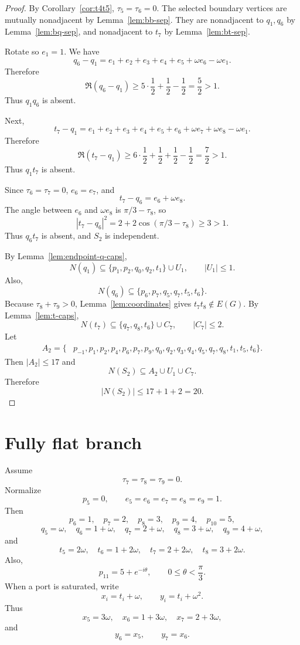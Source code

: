 \documentclass[11pt]{article}
\begin{document}
\begin{proof}
By Corollary~\ref{cor:t4t5}, $\tau_5=\tau_6=0$. The selected boundary vertices are mutually nonadjacent by Lemma~\ref{lem:bb-sep}. They are nonadjacent to $q_1,q_6$ by Lemma~\ref{lem:bq-sep}, and nonadjacent to $t_7$ by Lemma~\ref{lem:bt-sep}.

Rotate so $e_1=1$. We have
\[
  q_6-q_1=e_1+e_2+e_3+e_4+e_5+\omega e_6-\omega e_1.
\]
Therefore
\[
  \Re(q_6-q_1)\ge5\cdot\frac12+\frac12-\frac12=\frac52>1.
\]
Thus $q_1q_6$ is absent.

Next,
\[
  t_7-q_1=e_1+e_2+e_3+e_4+e_5+e_6+\omega e_7+\omega e_8-\omega e_1.
\]
Therefore
\[
  \Re(t_7-q_1)\ge6\cdot\frac12+\frac12+\frac12-\frac12=\frac72>1.
\]
Thus $q_1t_7$ is absent.

Since $\tau_6=\tau_7=0$, $e_6=e_7$, and
\[
  t_7-q_6=e_6+\omega e_8.
\]
The angle between $e_6$ and $\omega e_8$ is $\pi/3-\tau_8$, so
\[
  |t_7-q_6|^2=2+2\cos(\pi/3-\tau_8)\ge3>1.
\]
Thus $q_6t_7$ is absent, and $S_2$ is independent.

By Lemma~\ref{lem:endpoint-q-caps},
\[
  N(q_1)\subseteq\{p_1,p_2,q_0,q_2,t_1\}\cup U_1,
  \qquad |U_1|\le1.
\]
Also,
\[
  N(q_6)\subseteq\{p_6,p_7,q_5,q_7,t_5,t_6\}.
\]
Because $\tau_8+\tau_9>0$, Lemma~\ref{lem:coordinates} gives $t_7t_8\notin E(G)$. By Lemma~\ref{lem:t-caps},
\[
  N(t_7)\subseteq\{q_7,q_8,t_6\}\cup C_7,
  \qquad |C_7|\le2.
\]
Let
\[
\begin{aligned}
A_2=\{&p_{-1},p_1,p_2,p_4,p_6,p_7,p_9,q_0,q_2,q_3,q_4,q_5,q_7,q_8,t_1,t_5,t_6\}.
\end{aligned}
\]
Then $|A_2|\le17$ and
\[
  N(S_2)\subseteq A_2\cup U_1\cup C_7.
\]
Therefore
\[
  |N(S_2)|\le17+1+2=20.
\]
\end{proof}

\section{Fully flat branch}

Assume
\[
  \tau_7=\tau_8=\tau_9=0.
\]
Normalize
\[
  p_5=0,
  \qquad e_5=e_6=e_7=e_8=e_9=1.
\]
Then
\[
  p_6=1,
  \quad p_7=2,
  \quad p_8=3,
  \quad p_9=4,
  \quad p_{10}=5,
\]
\[
  q_5=\omega,
  \quad q_6=1+\omega,
  \quad q_7=2+\omega,
  \quad q_8=3+\omega,
  \quad q_9=4+\omega,
\]
and
\[
  t_5=2\omega,
  \quad t_6=1+2\omega,
  \quad t_7=2+2\omega,
  \quad t_8=3+2\omega.
\]
Also,
\[
  p_{11}=5+e^{-i\theta},
  \qquad 0\le\theta<\frac{\pi}{3}.
\]
When a port is saturated, write
\[
  x_i=t_i+\omega,
  \qquad y_i=t_i+\omega^2.
\]
Thus
\[
  x_5=3\omega,
  \quad x_6=1+3\omega,
  \quad x_7=2+3\omega,
\]
and
\[
  y_6=x_5,
  \qquad y_7=x_6.
\]
\end{document}
